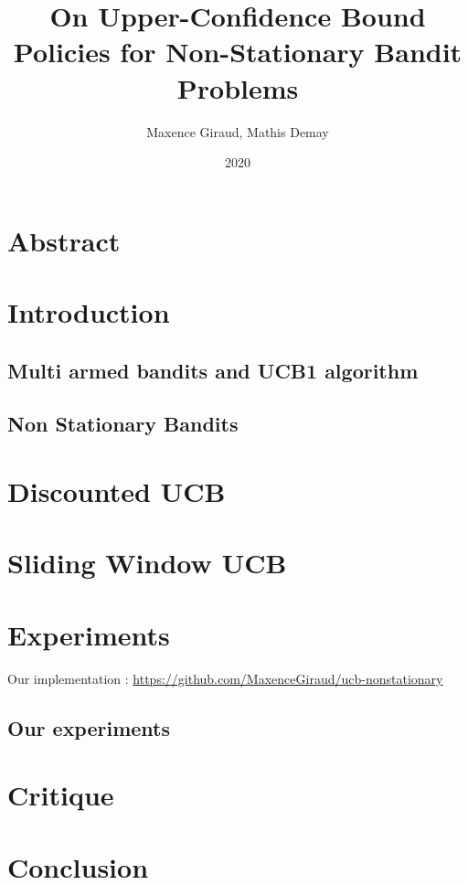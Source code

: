 \documentclass{article}
\title{On Upper-Confidence Bound Policies for Non-Stationary Bandit Problems}
\author{Maxence Giraud, Mathis Demay}
\date{2020}
\begin{document}
\maketitle

\section*{Abstract}

	

\section{Introduction}

	\subsection{Multi armed bandits and UCB1 algorithm}

		

	\subsection{Non Stationary Bandits}

		

\section{Discounted UCB}
	

\section{Sliding Window UCB}

	

\section{Experiments}
Our implementation : \url{https://github.com/MaxenceGiraud/ucb-nonstationary} 
	
	\subsection{Our experiments}
	
		

\section{Critique}

\section{Conclusion}


\end{document}
